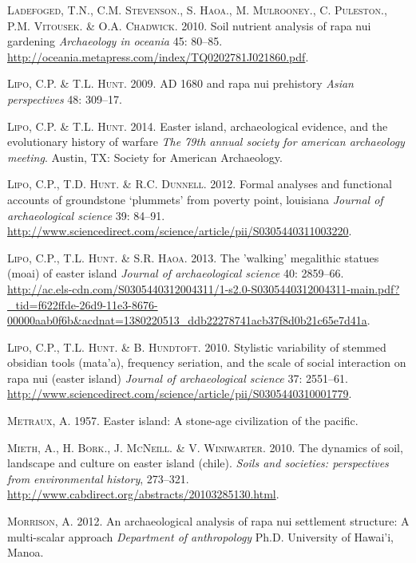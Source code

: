 \documentclass[]{article}
\begin{document}
\textsc{Ladefoged}, T.N., C.M. \textsc{Stevenson}., S. \textsc{Haoa}.,
M. \textsc{Mulrooney}., C. \textsc{Puleston}., P.M. \textsc{Vitousek}.
\& O.A. \textsc{Chadwick}. 2010. Soil nutrient analysis of rapa nui
gardening \emph{Archaeology in oceania} 45: 80--85.
\url{http://oceania.metapress.com/index/TQ0202781J021860.pdf}.

\textsc{Lipo}, C.P. \& T.L. \textsc{Hunt}. 2009. AD 1680 and rapa nui
prehistory \emph{Asian perspectives} 48: 309--17.

\textsc{Lipo}, C.P. \& T.L. \textsc{Hunt}. 2014. Easter island,
archaeological evidence, and the evolutionary history of warfare
\emph{The 79th annual society for american archaeology meeting}. Austin,
TX: Society for American Archaeology.

\textsc{Lipo}, C.P., T.D. \textsc{Hunt}. \& R.C. \textsc{Dunnell}. 2012.
Formal analyses and functional accounts of groundstone `plummets' from
poverty point, louisiana \emph{Journal of archaeological science} 39:
84--91.
\url{http://www.sciencedirect.com/science/article/pii/S0305440311003220}.

\textsc{Lipo}, C.P., T.L. \textsc{Hunt}. \& S.R. \textsc{Haoa}. 2013.
The 'walking' megalithic statues (moai) of easter island \emph{Journal
of archaeological science} 40: 2859--66.
\url{http://ac.els-cdn.com/S0305440312004311/1-s2.0-S0305440312004311-main.pdf?_tid=f622ffde-26d9-11e3-8676-00000aab0f6b\&acdnat=1380220513_ddb22278741acb37f8d0b21c65e7d41a}.

\textsc{Lipo}, C.P., T.L. \textsc{Hunt}. \& B. \textsc{Hundtoft}. 2010.
Stylistic variability of stemmed obsidian tools (mata'a), frequency
seriation, and the scale of social interaction on rapa nui (easter
island) \emph{Journal of archaeological science} 37: 2551--61.
\url{http://www.sciencedirect.com/science/article/pii/S0305440310001779}.

\textsc{Metraux}, A. 1957. Easter island: A stone-age civilization of
the pacific.

\textsc{Mieth}, A., H. \textsc{Bork}., J. \textsc{McNeill}. \& V.
\textsc{Winiwarter}. 2010. The dynamics of soil, landscape and culture
on easter island (chile). \emph{Soils and societies: perspectives from
environmental history}, 273--321.
\url{http://www.cabdirect.org/abstracts/20103285130.html}.

\textsc{Morrison}, A. 2012. An archaeological analysis of rapa nui
settlement structure: A multi-scalar approach \emph{Department of
anthropology} Ph.D. University of Hawai'i, Manoa.
\end{document}
